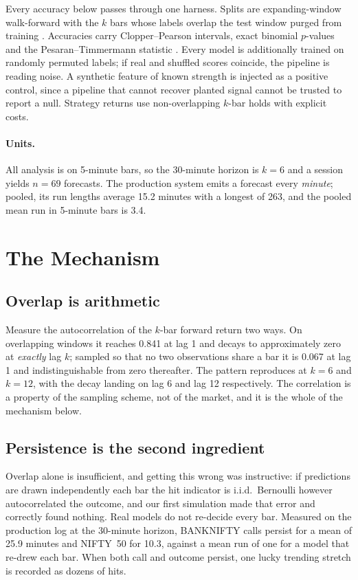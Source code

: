 \documentclass[runningheads]{llncs}
\begin{document}
Every accuracy below passes through one harness. Splits are expanding-window
walk-forward with the $k$ bars whose labels overlap the test window purged from
training \cite{prado2018}. Accuracies carry Clopper--Pearson \cite{clopper1934}
intervals, exact binomial $p$-values and the Pesaran--Timmermann statistic
\cite{pt1992}. Every model is additionally trained on randomly permuted labels;
if real and shuffled scores coincide, the pipeline is reading noise. A synthetic
feature of known strength is injected as a positive control, since a pipeline
that cannot recover planted signal cannot be trusted to report a null. Strategy
returns use non-overlapping $k$-bar holds with explicit costs.

\paragraph{Units.}
All analysis is on 5-minute bars, so the 30-minute horizon is $k=6$ and a
session yields $n=69$ forecasts. The production system emits a forecast every
\emph{minute}; pooled, its run lengths average 15.2 minutes with a longest of
263, and the pooled mean run in 5-minute bars is 3.4.

\section{The Mechanism}
\label{sec:mech}

\subsection{Overlap is arithmetic}

Measure the autocorrelation of the $k$-bar forward return two ways. On
overlapping windows it reaches 0.841 at lag 1 and decays to approximately zero at
\emph{exactly} lag $k$; sampled so that no two observations share a bar it is
0.067 at lag 1 and indistinguishable from zero thereafter. The pattern reproduces
at $k=6$ and $k=12$, with the decay landing on lag 6 and lag 12 respectively. The
correlation is a property of the sampling scheme, not of the market, and it is
the whole of the mechanism below.

\subsection{Persistence is the second ingredient}

Overlap alone is insufficient, and getting this wrong was instructive: if
predictions are drawn independently each bar the hit indicator is i.i.d.\
Bernoulli however autocorrelated the outcome, and our first simulation made that
error and correctly found nothing. Real models do not re-decide every bar.
Measured on the production log at the 30-minute horizon, BANKNIFTY calls persist
for a mean of 25.9 minutes and NIFTY~50 for 10.3, against a mean run of one for a
model that re-drew each bar. When both call and outcome persist, one lucky
trending stretch is recorded as dozens of hits.
\end{document}
